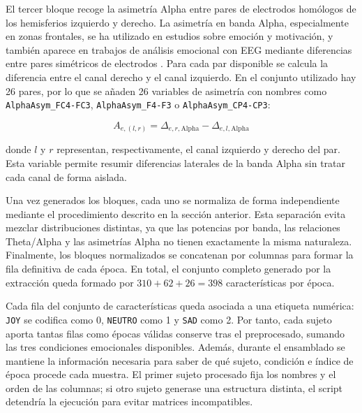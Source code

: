 El tercer bloque recoge la asimetría Alpha entre pares de electrodos homólogos de los hemisferios izquierdo y derecho. La asimetría en banda Alpha, especialmente en zonas frontales, se ha utilizado en estudios sobre emoción y motivación, y también aparece en trabajos de análisis emocional con \ac{EEG} mediante diferencias entre pares simétricos de electrodos \cite{koelstra2012deap,smith2017frontal}. Para cada par disponible se calcula la diferencia entre el canal derecho y el canal izquierdo. En el conjunto utilizado hay 26 pares, por lo que se añaden 26 variables de asimetría con nombres como \texttt{AlphaAsym\_FC4-FC3}, \texttt{AlphaAsym\_F4-F3} o \texttt{AlphaAsym\_CP4-CP3}:

\begin{myequation}[H]
\[
A_{e,(l,r)} = \Delta_{e,r,\mathrm{Alpha}} - \Delta_{e,l,\mathrm{Alpha}}
\]
\caption{Asimetría Alpha entre un par de canales homólogos.}
\label{eq:alpha_asymmetry}
\end{myequation}

donde \(l\) y \(r\) representan, respectivamente, el canal izquierdo y derecho del par. Esta variable permite resumir diferencias laterales de la banda Alpha sin tratar cada canal de forma aislada.

Una vez generados los bloques, cada uno se normaliza de forma independiente mediante el procedimiento descrito en la sección anterior. Esta separación evita mezclar distribuciones distintas, ya que las potencias por banda, las relaciones Theta/Alpha y las asimetrías Alpha no tienen exactamente la misma naturaleza. Finalmente, los bloques normalizados se concatenan por columnas para formar la fila definitiva de cada época. En total, el conjunto completo generado por la extracción queda formado por \(310 + 62 + 26 = 398\) características por época.

Cada fila del conjunto de características queda asociada a una etiqueta numérica: \texttt{JOY} se codifica como 0, \texttt{NEUTRO} como 1 y \texttt{SAD} como 2. Por tanto, cada sujeto aporta tantas filas como épocas válidas conserve tras el preprocesado, sumando las tres condiciones emocionales disponibles. Además, durante el ensamblado se mantiene la información necesaria para saber de qué sujeto, condición e índice de época procede cada muestra. El primer sujeto procesado fija los nombres y el orden de las columnas; si otro sujeto generase una estructura distinta, el script detendría la ejecución para evitar matrices incompatibles.

